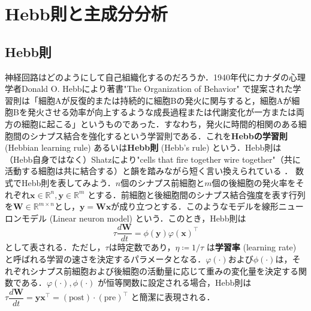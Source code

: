 \section{Hebb則と主成分分析}
\subsection{Hebb則}
神経回路はどのようにして自己組織化するのだろうか．1940年代にカナダの心理学者Donald O. Hebbにより著書"The Organization of Behavior"\citep{Hebb1949-iv} で提案された学習則は「細胞Aが反復的または持続的に細胞Bの発火に関与すると，細胞Aが細胞Bを発火させる効率が向上するような成長過程または代謝変化が一方または両方の細胞に起こる」というものであった．すなわち，発火に時間的相関のある細胞間のシナプス結合を強化するという学習則である．これを\textbf{Hebbの学習則} (Hebbian learning rule) あるいは\textbf{Hebb則} (Hebb's rule) という．Hebb則は（Hebb自身ではなく）Shatzにより"cells that fire together wire together"（共に活動する細胞は共に結合する）と韻を踏みながら短く言い換えられている \citep{Shatz1992-he}．
数式でHebb則を表してみよう．$n$個のシナプス前細胞と$m$個の後細胞の発火率をそれぞれ$\mathbf{x}\in \mathbb{R}^n, \mathbf{y}\in \mathbb{R}^m$ とする．前細胞と後細胞間のシナプス結合強度を表す行列を$\mathbf{W}\in \mathbb{R}^{m\times n}$とし，$\mathbf{y}=\mathbf{W}\mathbf{x}$が成り立つとする．このようなモデルを線形ニューロンモデル (Linear neuron model) という．このとき，Hebb則は
\begin{equation}
\tau\frac{d\mathbf{W}}{dt}=\phi(\mathbf{y})\varphi(\mathbf{x})^\top
\end{equation}
として表される．ただし，$\tau$は時定数であり，$\eta\coloneqq 1/\tau$ は\textbf{学習率} (learning rate) と呼ばれる学習の速さを決定するパラメータとなる．$\varphi(\cdot)$および$\phi(\cdot)$は，それぞれシナプス前細胞および後細胞の活動量に応じて重みの変化量を決定する関数である．$\varphi(\cdot), \phi(\cdot)$ が恒等関数に設定される場合，Hebb則は $\tau\dfrac{d\mathbf{W}}{dt}=\mathbf{y}\mathbf{x}^\top=(\text{post})\cdot (\text{pre})^\top$ と簡潔に表現される．
